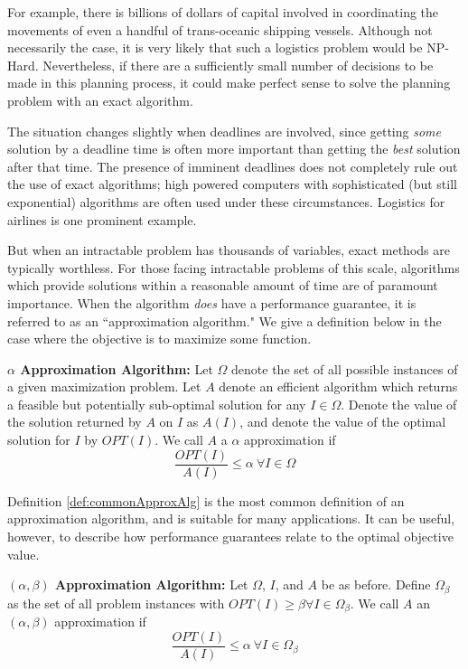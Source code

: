 For example, there is billions of dollars of capital involved in coordinating the movements of even a handful of trans-oceanic shipping vessels. 
Although not necessarily the case, it is very likely that such a logistics problem would be NP-Hard.
Nevertheless, if there are a sufficiently small number of decisions to be made in this planning process, it could make perfect sense to solve the planning problem with an exact algorithm.

The situation changes slightly when deadlines are involved, since getting \textit{some} solution by a deadline time is often more important than getting the \textit{best} solution after that time. 
The presence of imminent deadlines does not completely rule out the use of exact algorithms; high powered computers with sophisticated (but still exponential) algorithms are often used under these circumstances. 
Logistics for airlines is one prominent example.

But when an intractable problem has thousands of variables, exact methods are typically worthless. 
For those facing intractable problems of this scale, algorithms which provide solutions within a reasonable amount of time are of paramount importance.  
When the algorithm \textit{does} have a performance guarantee, it is referred to as an ``approximation algorithm."
We give a definition below in the case where the objective is to maximize some function. 

\begin{definition}
\textbf{$\alpha$ Approximation Algorithm: } Let $\Omega$ denote the set of all possible instances of a given maximization problem. 
Let $A$ denote an efficient algorithm which returns a feasible but potentially sub-optimal solution for any $I \in \Omega$. 
Denote the value of the solution returned by $A$ on $I$ as $A(I)$, and denote the value of the optimal solution for $I$ by $OPT(I)$. We call $A$ a $\alpha$ approximation if
\begin{equation*}
\frac{OPT(I)}{A(I)} \leq \alpha ~ \forall I \in \Omega
\end{equation*}
\label{def:commonApproxAlg}
\end{definition}

Definition \ref{def:commonApproxAlg} is the most common definition of an approximation algorithm, and is suitable for many applications. It can be useful, however, to describe how performance guarantees relate to the optimal objective value. 
\begin{definition}
\textbf{$(\alpha,\beta)$  Approximation Algorithm: } Let $\Omega$, $I$, and $A$ be as before. 
Define $\Omega_\beta$ as the set of all problem instances with $OPT(I) \geq \beta \forall I \in \Omega_\beta$.
We call $A$ an $(\alpha,\beta)$ approximation if 
\begin{equation*}
\frac{OPT(I)}{A(I)} \leq \alpha ~ \forall I \in \Omega_{\beta}
\end{equation*}
\label{def:twoParamApproxAlg}
\end{definition}


